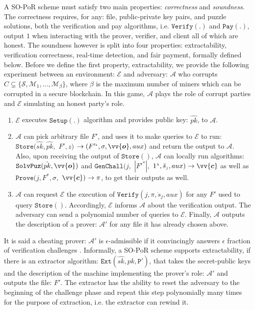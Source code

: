   
A SO-PoR scheme must satisfy two main properties: \emph{correctness} and \emph{soundness}. The correctness requires, for any: file, public-private key pairs, and puzzle solutions, both the verification  and pay algorithms, i.e. $\mathtt{Verify}(.)$ and $\mathtt{Pay}(.)$, output $1$ when interacting with  the  prover, verifier, and client  all of which are honest.  The soundness however is split into four properties: extractability, verification correctness, real-time detection, and fair payment, formally defined below.  Before we define the first property,  extractability, we provide the following  experiment between an environment: $\mathcal{E}$ and  adversary: $\mathcal{A}$ who corrupts $C\subsetneq\{\mathcal{S},\mathcal{M}_{\scriptscriptstyle 1},...,\mathcal{M}_{\scriptscriptstyle\beta}\}$, where $\beta$ is the maximum number of miners which can be corrupted in a secure blockchain. In this game, $\mathcal{A}$ plays the role of corrupt parties and $\mathcal{E}$ simulating an honest party's role. 


\begin{enumerate}
\item $\mathcal{E}$ executes $\mathtt{Setup}(.)$ algorithm and provides public key: $\hat{pk}$, to $\mathcal{A}$.   
\item $\mathcal{A}$ can pick  arbitrary file $F'$, and  uses it to make queries to  $\mathcal{E}$ to run:  $\mathtt{Store}(\hat{sk},\hat{pk},$ $ F',z)$ $\rightarrow (F'^{\scriptscriptstyle *}, \sigma, \vv{\bm{o}},aux)$  and return the output to $\mathcal{A}$. Also, upon receiving the output of $\mathtt{Store}()$, $\mathcal{A}$ can locally run  algorithms: $\mathtt {SolvPuz}(\hat{pk},\vv{\bm{o}})$ and   $\mathtt{GenChall}(j,$ $|F'^{\scriptscriptstyle *}|, $ $ 1^{\scriptscriptstyle\lambda},\ddot{s}_{\scriptscriptstyle j},aux)\rightarrow \vv{\bm{c}}$ as well as  $\mathtt{Prove}(j,F^{\scriptscriptstyle *}, \sigma, $ $ \vv{\bm{c}})\rightarrow \pi$,  to get their outputs as well. 
\item $\mathcal{A}$ can request $\mathcal{E}$ the execution of $\mathtt{Verify}(j,\pi,\ddot{s}_{\scriptscriptstyle j},aux)$ for any $F'$ used to query $\mathtt{Store}()$. Accordingly, $\mathcal{E}$ informs  $\mathcal{A}$ about the verification output. The adversary can send a polynomial number of queries to $\mathcal{E}$. Finally, $\mathcal{A}$ outputs the description of a prover: $\mathcal{A}'$ for any file it has already chosen above. 
\end{enumerate}

It is said a cheating prover: $\mathcal{A}'$ is $\epsilon$-admissible if it convincingly answers $\epsilon$ fraction of verification challenges \cite{DBLP:conf/asiacrypt/ShachamW08}. Informally, a SO-PoR scheme supports extractability, if there is an extractor algorithm: $\mathtt{Ext}(\hat{sk},\hat{pk},\mathtt{P}')$, that takes the secret-public keys and the description of the  machine implementing the prover's role: $\mathcal{A}'$ and outputs the file: $F'$. The extractor has the ability to reset the adversary to the beginning of the challenge phase and repeat this step polynomially many times for the purpose of extraction, i.e. the extractor can rewind it.

